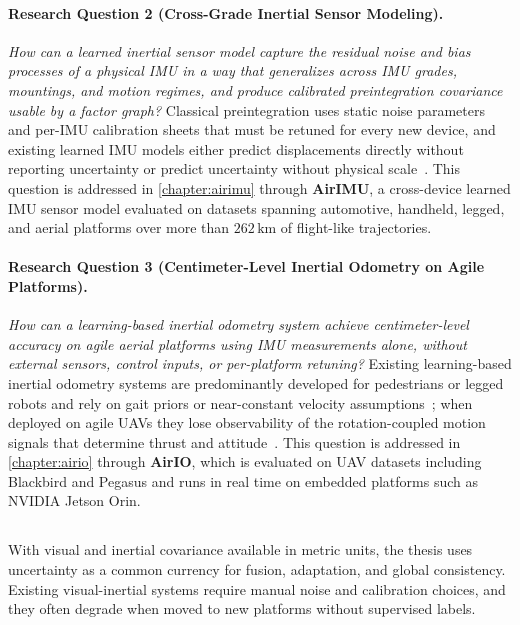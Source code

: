\paragraph{Research Question 2 (Cross-Grade Inertial Sensor Modeling).}
\textit{How can a learned inertial sensor model capture the residual noise and bias processes of a physical IMU in a way that generalizes across IMU grades, mountings, and motion regimes, and produce calibrated preintegration covariance usable by a factor graph?}
Classical preintegration uses static noise parameters and per-IMU calibration sheets that must be retuned for every new device, and existing learned IMU models either predict displacements directly without reporting uncertainty or predict uncertainty without physical scale~\cite{liu2020tlio, sun2021idol}.
This question is addressed in \cref{chapter:airimu} through \textbf{AirIMU}, a cross-device learned IMU sensor model evaluated on datasets spanning automotive, handheld, legged, and aerial platforms over more than $262\,\mathrm{km}$ of flight-like trajectories.

\paragraph{Research Question 3 (Centimeter-Level Inertial Odometry on Agile Platforms).}
\textit{How can a learning-based inertial odometry system achieve centimeter-level accuracy on agile aerial platforms using IMU measurements alone, without external sensors, control inputs, or per-platform retuning?}
Existing learning-based inertial odometry systems are predominantly developed for pedestrians or legged robots and rely on gait priors or near-constant velocity assumptions~\cite{liu2020tlio, herath2020ronin, buchanan2022deep}; when deployed on agile UAVs they lose observability of the rotation-coupled motion signals that determine thrust and attitude~\cite{CioffiRal2023}.
This question is addressed in \cref{chapter:airio} through \textbf{AirIO}, which is evaluated on UAV datasets including Blackbird and Pegasus and runs in real time on embedded platforms such as NVIDIA Jetson Orin.

\subsection{\partIIITitle}
\label{subsec:org_part3}

With visual and inertial covariance available in metric units, the thesis uses uncertainty as a common currency for fusion, adaptation, and global consistency.
Existing visual-inertial systems require manual noise and calibration choices, and they often degrade when moved to new platforms without supervised labels.

